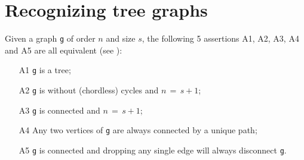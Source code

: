 \section{Recognizing tree graphs}
\label{sec:22.2}

Given a graph \texttt{g} of order $n$ and size $s$, the following 5 assertions A1, A2, A3, A4 and A5 are all equivalent (see \citep{BAR-1991}):
\begin{itemize}
\item [A1] \texttt{g} is a tree;
\item [A2] \texttt{g} is without (chordless) cycles and $n \,=\, s + 1$;
\item [A3] \texttt{g} is connected and $n \,=\, s + 1$;
\item [A4] Any two vertices of \texttt{g} are always connected by a unique path;
\item [A5] \texttt{g} is connected and dropping any single edge will always disconnect \texttt{g}.
\end{itemize}

